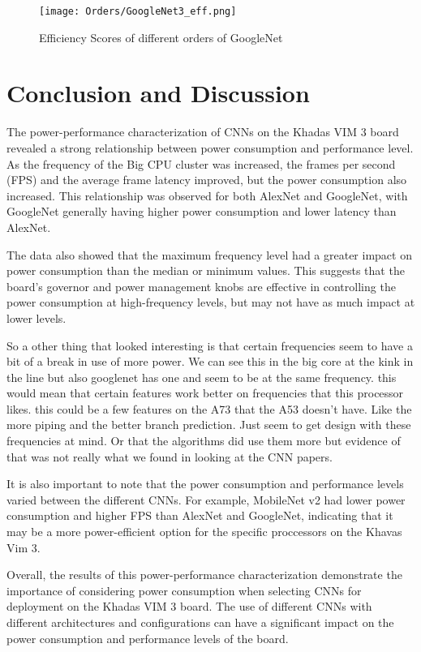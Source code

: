 \documentclass[a4paper, 12pt, fleqn]{article}
\begin{document}
\begin{figure}[ht]
    \centering
    \texttt{[image: Orders/GoogleNet3\_eff.png]}
    \caption{Efficiency Scores of different orders of GoogleNet}
    \label{fig:f8}
\end{figure}



\section{Conclusion and Discussion}
The power-performance characterization of CNNs on the Khadas VIM 3 board revealed a strong relationship between power consumption and performance level. As the frequency of the Big CPU cluster was increased, the frames per second (FPS) and the average frame latency improved, but the power consumption also increased. This relationship was observed for both AlexNet and GoogleNet, with GoogleNet generally having higher power consumption and lower latency than AlexNet.

The data also showed that the maximum frequency level had a greater impact on power consumption than the median or minimum values. This suggests that the board's governor and power management knobs are effective in controlling the power consumption at high-frequency levels, but may not have as much impact at lower levels.

So a other thing that looked interesting is that certain frequencies seem to have a bit of a break in use of  more power. We can see this in the big core at the kink in the line but also googlenet has one and seem to be at the same frequency. this would mean that certain features work better on frequencies that this processor likes. this could be a few features on the A73 that the A53 doesn't have. Like the more piping and the better branch prediction. Just seem to get design with these frequencies at mind. Or that the algorithms did use them more but evidence of that was not really what we found in looking at the CNN papers.

It is also important to note that the power consumption and performance levels varied between the different CNNs. For example, MobileNet v2 had lower power consumption and higher FPS than AlexNet and GoogleNet, indicating that it may be a more power-efficient option for the specific proccessors on the Khavas Vim 3.

Overall, the results of this power-performance characterization demonstrate the importance of considering power consumption when selecting CNNs for deployment on the Khadas VIM 3 board. The use of different CNNs with different architectures and configurations can have a significant impact on the power consumption and performance levels of the board.
\end{document}
